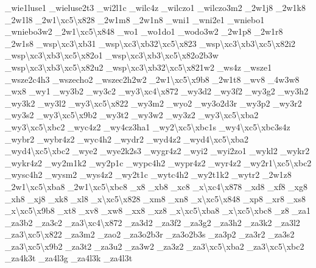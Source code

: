 {\-\_\-wie1luse1 \-\_\-wieluse2t3 \-\_\-wi2l1c \-\_\-wilc4z \-\_\-wilczo1 \-\_\-wilczo3m2 \-\_\-2w1j8 \-\_\-2w1k8 \-\_\-2w1l8 \-\_\-2w1\textbackslash{}xc5\textbackslash{}x828 \-\_\-2w1m8 \-\_\-2w1n8 \-\_\-wni1 \-\_\-wni2e1 \-\_\-wniebo1 \-\_\-wniebo3w2 \-\_\-2w1\textbackslash{}xc5\textbackslash{}x848 \-\_\-wo1 \-\_\-wo1do1 \-\_\-wodo3w2 \-\_\-2w1p8 \-\_\-2w1r8 \-\_\-2w1s8 \-\_\-wsp\textbackslash{}xc3\textbackslash{}xb31 \-\_\-wsp\textbackslash{}xc3\textbackslash{}xb32\textbackslash{}xc5\textbackslash{}x823 \-\_\-wsp\textbackslash{}xc3\textbackslash{}xb3\textbackslash{}xc5\textbackslash{}x82i2 \-\_\-wsp\textbackslash{}xc3\textbackslash{}xb3\textbackslash{}xc5\textbackslash{}x82o1 \-\_\-wsp\textbackslash{}xc3\textbackslash{}xb3\textbackslash{}xc5\textbackslash{}x82o2b3w \-\_\-wsp\textbackslash{}xc3\textbackslash{}xb3\textbackslash{}xc5\textbackslash{}x82u2 \-\_\-wsp\textbackslash{}xc3\textbackslash{}xb32\textbackslash{}xc5\textbackslash{}x821w2 \-\_\-ws4z \-\_\-wsze1 \-\_\-wsze2c4h3 \-\_\-wszecho2 \-\_\-wszec2h2w2 \-\_\-2w1\textbackslash{}xc5\textbackslash{}x9b8 \-\_\-2w1t8 \-\_\-wv8 \-\_\-4w3w8 \-\_\-wx8 \-\_\-wy1 \-\_\-wy3b2 \-\_\-wy3c2 \-\_\-wy3\textbackslash{}xc4\textbackslash{}x872 \-\_\-wy3d2 \-\_\-wy3f2 \-\_\-wy3g2 \-\_\-wy3h2 \-\_\-wy3k2 \-\_\-wy3l2 \-\_\-wy3\textbackslash{}xc5\textbackslash{}x822 \-\_\-wy3m2 \-\_\-wyo2 \-\_\-wy3o2d3r \-\_\-wy3p2 \-\_\-wy3r2 \-\_\-wy3s2 \-\_\-wy3\textbackslash{}xc5\textbackslash{}x9b2 \-\_\-wy3t2 \-\_\-wy3w2 \-\_\-wy3z2 \-\_\-wy3\textbackslash{}xc5\textbackslash{}xba2 \-\_\-wy3\textbackslash{}xc5\textbackslash{}xbc2 \-\_\-wyc4z2 \-\_\-wy4cz3ha1 \-\_\-wy2\textbackslash{}xc5\textbackslash{}xbc1s \-\_\-wy4\textbackslash{}xc5\textbackslash{}xbc3s4z \-\_\-wybr2 \-\_\-wybr4z2 \-\_\-wyc4h2 \-\_\-wydr2 \-\_\-wyd4z2 \-\_\-wyd4\textbackslash{}xc5\textbackslash{}xba2 \-\_\-wyd4\textbackslash{}xc5\textbackslash{}xbc2 \-\_\-wye2 \-\_\-wye2k2s3 \-\_\-wygr4z2 \-\_\-wyi2 \-\_\-wyi2zo1 \-\_\-wykl2 \-\_\-wykr2 \-\_\-wykr4z2 \-\_\-wy2m1k2 \-\_\-wy2p1c \-\_\-wypc4h2 \-\_\-wypr4z2 \-\_\-wyr4z2 \-\_\-wy2r1\textbackslash{}xc5\textbackslash{}xbc2 \-\_\-wysc4h2 \-\_\-wysm2 \-\_\-wys4z2 \-\_\-wy2t1c \-\_\-wytc4h2 \-\_\-wy2t1k2 \-\_\-wytr2 \-\_\-2w1z8 \-\_\-2w1\textbackslash{}xc5\textbackslash{}xba8 \-\_\-2w1\textbackslash{}xc5\textbackslash{}xbc8 \-\_\-x8 \-\_\-xb8 \-\_\-xc8 \-\_\-x\textbackslash{}xc4\textbackslash{}x878 \-\_\-xd8 \-\_\-xf8 \-\_\-xg8 \-\_\-xh8 \-\_\-xj8 \-\_\-xk8 \-\_\-xl8 \-\_\-x\textbackslash{}xc5\textbackslash{}x828 \-\_\-xm8 \-\_\-xn8 \-\_\-x\textbackslash{}xc5\textbackslash{}x848 \-\_\-xp8 \-\_\-xr8 \-\_\-xs8 \-\_\-x\textbackslash{}xc5\textbackslash{}x9b8 \-\_\-xt8 \-\_\-xv8 \-\_\-xw8 \-\_\-xx8 \-\_\-xz8 \-\_\-x\textbackslash{}xc5\textbackslash{}xba8 \-\_\-x\textbackslash{}xc5\textbackslash{}xbc8 \-\_\-z8 \-\_\-za1 \-\_\-za3b2 \-\_\-za3c2 \-\_\-za3\textbackslash{}xc4\textbackslash{}x872 \-\_\-za3d2 \-\_\-za3f2 \-\_\-za3g2 \-\_\-za3h2 \-\_\-za3k2 \-\_\-za3l2 \-\_\-za3\textbackslash{}xc5\textbackslash{}x822 \-\_\-za3m2 \-\_\-zao2 \-\_\-za3o2b3r \-\_\-za3o2b3s \-\_\-za3p2 \-\_\-za3r2 \-\_\-za3s2 \-\_\-za3\textbackslash{}xc5\textbackslash{}x9b2 \-\_\-za3t2 \-\_\-za3u2 \-\_\-za3w2 \-\_\-za3z2 \-\_\-za3\textbackslash{}xc5\textbackslash{}xba2 \-\_\-za3\textbackslash{}xc5\textbackslash{}xbc2 \-\_\-za4k3t \-\_\-za4l3g \-\_\-za4l3k \-\_\-za4l3t }
